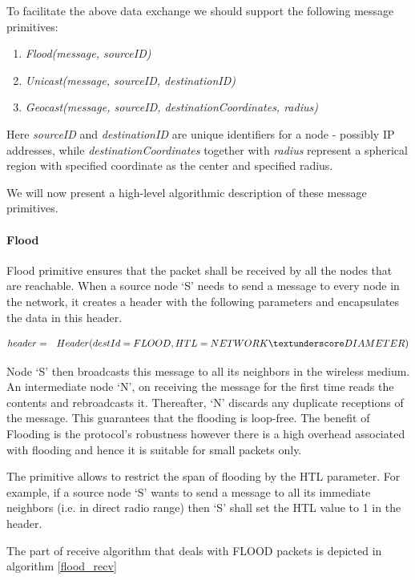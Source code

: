 To facilitate the above data exchange we should support the following message primitives:
\begin{enumerate}
\item \emph{Flood(message, sourceID)}
\item \emph{Unicast(message, sourceID, destinationID)}
\item \emph{Geocast(message, sourceID, destinationCoordinates, radius)}
\end{enumerate}

Here \emph{sourceID} and \emph{destinationID} are unique identifiers for a node - possibly IP addresses, while \emph{destinationCoordinates} together with \emph{radius} represent a spherical region with specified coordinate as the center and specified radius.

We will now present a high-level algorithmic description of these message primitives.

\paragraph{Flood}

Flood primitive ensures that the packet shall be received by all the nodes that are reachable. When a source node `S' needs to send a message to every node in the network, it creates a header with the following parameters and encapsulates the data in this header.

\begin{eqnarray*}
& header = &Header(destId = FLOOD, HTL = NETWORK\textunderscore DIAMETER)
\end{eqnarray*} 

Node `S' then broadcasts this message to all its neighbors in the wireless medium. An intermediate node `N', on receiving the message for the first time reads the contents and rebroadcasts it. Thereafter, `N' discards any duplicate receptions of the message. This guarantees that the flooding is loop-free. The benefit of Flooding is the protocol's robustness however there is a high overhead associated with flooding and hence it is suitable for small packets only.

The primitive allows to restrict the span of flooding by the HTL parameter. For example, if a source node `S' wants to send a message to all its immediate neighbors (i.e. in direct radio range) then `S' shall set the HTL value to 1 in the header.

The part of receive algorithm that deals with FLOOD packets is depicted in algorithm \ref{flood_recv}

